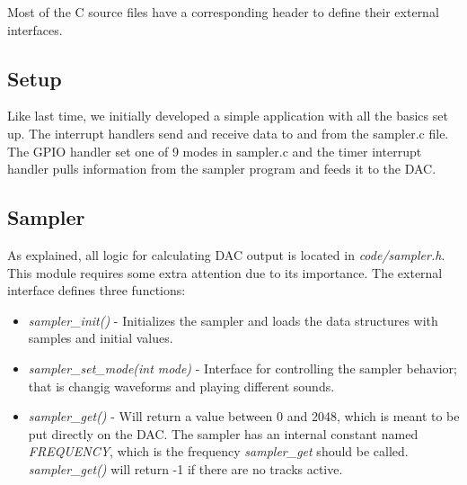 Most of the C source files have a corresponding header to define their external interfaces.

\subsection{Setup}
Like last time, we initially developed a simple application with all the basics set up. The interrupt handlers send and receive data to and from the sampler.c file. The GPIO handler set one of 9 modes in sampler.c and the timer interrupt handler pulls information from the sampler program and feeds it to the DAC.

\subsection{Sampler}
As explained, all logic for calculating DAC output is located in \emph{code/sampler.h}. This module requires some extra attention due to its importance. The external interface defines three functions:
\begin{itemize}
	\item \emph{sampler\_init()} - Initializes the sampler and loads the data structures with samples and initial values.
	\item \emph{sampler\_set\_mode(int mode)} - Interface for controlling the sampler behavior; that is changig waveforms and playing different sounds.
	\item \emph{sampler\_get()} - Will return a value between 0 and 2048, which is meant to be put directly on the DAC. The sampler has an internal constant named \emph{FREQUENCY}, which is the frequency \emph{sampler\_get} should be called. \emph{sampler\_get()} will return -1 if there are no tracks active.
\end{itemize}
